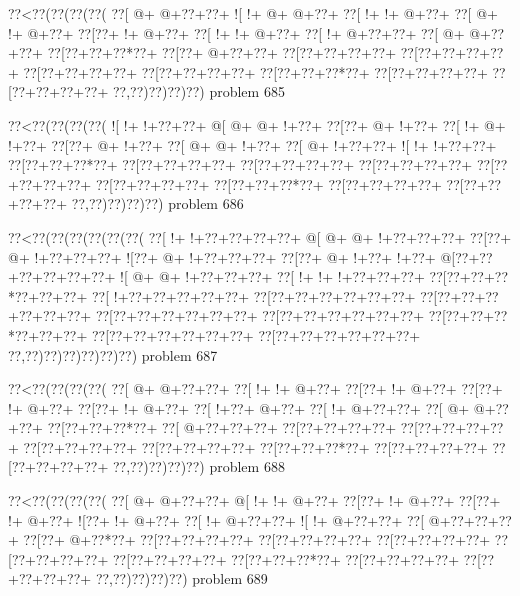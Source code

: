\vbox{\vbox{\goo
\0??<\0??(\0??(\0??(\0??(
\0??[\- @+\- @+\0??+\0??+
\- ![\- !+\- @+\- @+\0??+
\0??[\- !+\- !+\- @+\0??+
\0??[\- @+\- !+\- @+\0??+
\0??[\0??+\- !+\- @+\0??+
\0??[\- !+\- !+\- @+\0??+
\0??[\- !+\- @+\0??+\0??+
\0??[\- @+\- @+\0??+\0??+
\0??[\0??+\0??+\0??*\0??+
\0??[\0??+\- @+\0??+\0??+
\0??[\0??+\0??+\0??+\0??+
\0??[\0??+\0??+\0??+\0??+
\0??[\0??+\0??+\0??+\0??+
\0??[\0??+\0??+\0??+\0??+
\0??[\0??+\0??+\0??*\0??+
\0??[\0??+\0??+\0??+\0??+
\0??[\0??+\0??+\0??+\0??+
\0??,\0??)\0??)\0??)\0??)
}
\hfil problem 685\hfil\break
}

\vbox{\vbox{\goo
\0??<\0??(\0??(\0??(\0??(
\- ![\- !+\- !+\0??+\0??+
\- @[\- @+\- @+\- !+\0??+
\0??[\0??+\- @+\- !+\0??+
\0??[\- !+\- @+\- !+\0??+
\0??[\0??+\- @+\- !+\0??+
\0??[\- @+\- @+\- !+\0??+
\0??[\- @+\- !+\0??+\0??+
\- ![\- !+\- !+\0??+\0??+
\0??[\0??+\0??+\0??*\0??+
\0??[\0??+\0??+\0??+\0??+
\0??[\0??+\0??+\0??+\0??+
\0??[\0??+\0??+\0??+\0??+
\0??[\0??+\0??+\0??+\0??+
\0??[\0??+\0??+\0??+\0??+
\0??[\0??+\0??+\0??*\0??+
\0??[\0??+\0??+\0??+\0??+
\0??[\0??+\0??+\0??+\0??+
\0??,\0??)\0??)\0??)\0??)
}
\hfil problem 686\hfil\break
}

\vbox{\vbox{\goo
\0??<\0??(\0??(\0??(\0??(\0??(\0??(
\0??[\- !+\- !+\0??+\0??+\0??+\0??+
\- @[\- @+\- @+\- !+\0??+\0??+\0??+
\0??[\0??+\- @+\- !+\0??+\0??+\0??+
\- ![\0??+\- @+\- !+\0??+\0??+\0??+
\0??[\0??+\- @+\- !+\0??+\- !+\0??+
\- @[\0??+\0??+\0??+\0??+\0??+\0??+
\- ![\- @+\- @+\- !+\0??+\0??+\0??+
\0??[\- !+\- !+\- !+\0??+\0??+\0??+
\0??[\0??+\0??+\0??*\0??+\0??+\0??+
\0??[\- !+\0??+\0??+\0??+\0??+\0??+
\0??[\0??+\0??+\0??+\0??+\0??+\0??+
\0??[\0??+\0??+\0??+\0??+\0??+\0??+
\0??[\0??+\0??+\0??+\0??+\0??+\0??+
\0??[\0??+\0??+\0??+\0??+\0??+\0??+
\0??[\0??+\0??+\0??*\0??+\0??+\0??+
\0??[\0??+\0??+\0??+\0??+\0??+\0??+
\0??[\0??+\0??+\0??+\0??+\0??+\0??+
\0??,\0??)\0??)\0??)\0??)\0??)\0??)
}
\hfil problem 687\hfil\break
}

\vbox{\vbox{\goo
\0??<\0??(\0??(\0??(\0??(
\0??[\- @+\- @+\0??+\0??+
\0??[\- !+\- !+\- @+\0??+
\0??[\0??+\- !+\- @+\0??+
\0??[\0??+\- !+\- @+\0??+
\0??[\0??+\- !+\- @+\0??+
\0??[\- !+\0??+\- @+\0??+
\0??[\- !+\- @+\0??+\0??+
\0??[\- @+\- @+\0??+\0??+
\0??[\0??+\0??+\0??*\0??+
\0??[\- @+\0??+\0??+\0??+
\0??[\0??+\0??+\0??+\0??+
\0??[\0??+\0??+\0??+\0??+
\0??[\0??+\0??+\0??+\0??+
\0??[\0??+\0??+\0??+\0??+
\0??[\0??+\0??+\0??*\0??+
\0??[\0??+\0??+\0??+\0??+
\0??[\0??+\0??+\0??+\0??+
\0??,\0??)\0??)\0??)\0??)
}
\hfil problem 688\hfil\break
}

\vbox{\vbox{\goo
\0??<\0??(\0??(\0??(\0??(
\0??[\- @+\- @+\0??+\0??+
\- @[\- !+\- !+\- @+\0??+
\0??[\0??+\- !+\- @+\0??+
\0??[\0??+\- !+\- @+\0??+
\- ![\0??+\- !+\- @+\0??+
\0??[\- !+\- @+\0??+\0??+
\- ![\- !+\- @+\0??+\0??+
\0??[\- @+\0??+\0??+\0??+
\0??[\0??+\- @+\0??*\0??+
\0??[\0??+\0??+\0??+\0??+
\0??[\0??+\0??+\0??+\0??+
\0??[\0??+\0??+\0??+\0??+
\0??[\0??+\0??+\0??+\0??+
\0??[\0??+\0??+\0??+\0??+
\0??[\0??+\0??+\0??*\0??+
\0??[\0??+\0??+\0??+\0??+
\0??[\0??+\0??+\0??+\0??+
\0??,\0??)\0??)\0??)\0??)
}
\hfil problem 689\hfil\break
}

